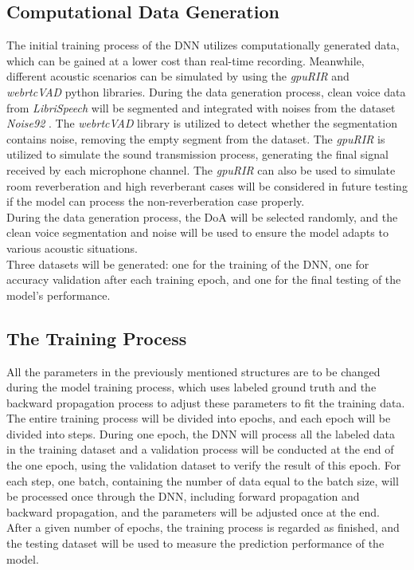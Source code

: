 \subsection*{Computational Data Generation}
The initial training process of the DNN utilizes computationally generated data, which can be gained at a lower cost than real-time recording. Meanwhile, different acoustic scenarios can be simulated by using the \textit{gpuRIR} \cite{diaz-guerra_gpurir_2021} and \textit{webrtcVAD} python libraries. During the data generation process, clean voice data from \textit{LibriSpeech} \cite{panayotov_resource_2015} will be segmented and integrated with noises from the dataset \textit{Noise92} \cite{andrew_assessment_1993}. The \textit{webrtcVAD} library is utilized to detect whether the segmentation contains noise, removing the empty segment from the dataset. The \textit{gpuRIR} \cite{diaz-guerra_gpurir_2021} is utilized to simulate the sound transmission process, generating the final signal received by each microphone channel. The \textit{gpuRIR} \cite{diaz-guerra_gpurir_2021} can also be used to simulate room reverberation and high reverberant cases will be considered in future testing if the model can process the non-reverberation case properly.\\
During the data generation process, the DoA will be selected randomly, and the clean voice segmentation and noise will be used to ensure the model adapts to various acoustic situations.\\
Three datasets will be generated: one for the training of the DNN, one for accuracy validation after each training epoch, and one for the final testing of the model's performance.

\subsection*{The Training Process}
All the parameters in the previously mentioned structures are to be changed during the model training process, which uses labeled ground truth and the backward propagation process to adjust these parameters to fit the training data. \\
The entire training process will be divided into epochs, and each epoch will be divided into steps. During one epoch, the DNN will process all the labeled data in the training dataset and a validation process will be conducted at the end of the one epoch, using the validation dataset to verify the result of this epoch. For each step, one batch, containing the number of data equal to the batch size, will be processed once through the DNN, including forward propagation and backward propagation, and the parameters will be adjusted once at the end.\\
After a given number of epochs, the training process is regarded as finished, and the testing dataset will be used to measure the prediction performance of the model.
